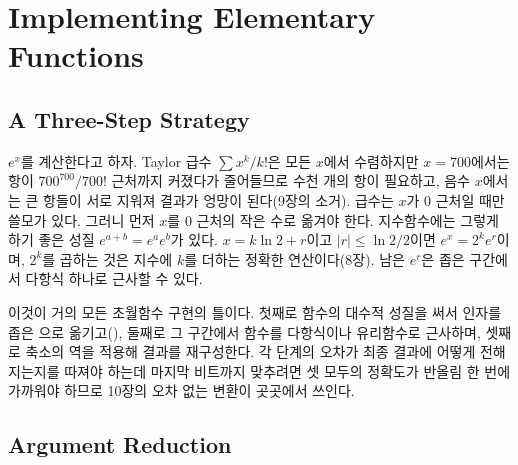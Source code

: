 \chapter{Implementing Elementary Functions}
\label{ch:elementary-functions}


\section{A Three-Step Strategy}
\label{sec:three-steps}

$e^x$를 계산한다고 하자. Taylor 급수 $\sum x^k/k!$은 모든 $x$에서 수렴하지만 $x=700$에서는 항이 $700^{700}/700!$ 근처까지 커졌다가 줄어들므로 수천 개의 항이 필요하고, 음수 $x$에서는 큰 항들이 서로 지워져 결과가 엉망이 된다(9장의 소거). 급수는 $x$가 $0$ 근처일 때만 쓸모가 있다. 그러니 먼저 $x$를 $0$ 근처의 작은 수로 옮겨야 한다. 지수함수에는 그렇게 하기 좋은 성질 $e^{a+b}=e^ae^b$가 있다. $x=k\ln2+r$이고 $|r|\le\ln2/2$이면 $e^x=2^ke^r$이며, $2^k$를 곱하는 것은 지수에 $k$를 더하는 정확한 연산이다(8장). 남은 $e^r$은 좁은 구간에서 다항식 하나로 근사할 수 있다.

이것이 거의 모든 초월함수 구현의 틀이다. 첫째로 함수의 대수적 성질을 써서 인자를 좁은 으로 옮기고(), 둘째로 그 구간에서 함수를 다항식이나 유리함수로 근사하며, 셋째로 축소의 역을 적용해 결과를 재구성한다. 각 단계의 오차가 최종 결과에 어떻게 전해지는지를 따져야 하는데 마지막 비트까지 맞추려면 셋 모두의 정확도가 반올림 한 번에 가까워야 하므로 10장의 오차 없는 변환이 곳곳에서 쓰인다.

\section{Argument Reduction}
\label{sec:reduction}


